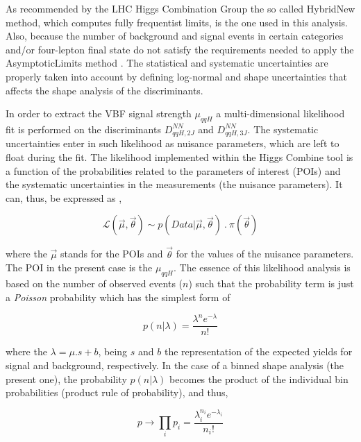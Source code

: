 As recommended by the LHC Higgs Combination Group \cite{bib:HiggsCombineToolWebPage} the so called HybridNew method, which computes fully frequentist limits, is the one used in this analysis. Also, because the number of background and signal events in certain categories and/or four-lepton final state do not satisfy the requirements needed to apply the AsymptoticLimits method \cite{bib:HiggsCombineToolFNALWorkshop2018}. The statistical and systematic uncertainties are properly taken into account by defining log-normal and shape uncertainties that affects the shape analysis of the discriminants.

In order to extract the VBF signal strength $\mu_{qqH}$ a multi-dimensional likelihood fit is performed on the discriminants $D_{qqH,2J}^{NN}$ and $D_{qqH,3J}^{NN}$. The systematic uncertainties enter in such likelihood as nuisance parameters, which are left to float during the fit. The likelihood implemented within the Higgs Combine tool is a function of the probabilities related to the parameters of interest (POIs) and the systematic uncertainties in the measurements (the nuisance parameters). It can, thus, be expressed as \cite{bib:HiggsCombineToolFNALWorkshop2018},

\begin{equation}
\mathcal{L}(\vec{\mu},\vec{\theta}) \sim p(Data | \vec{\mu},\vec{\theta})~.~ \pi(\vec{\theta})
\end{equation}

where the $\vec{\mu}$ stands for the POIs and $\vec{\theta}$ for the values of the nuisance parameters. The POI in the present case is the $\mu_{qqH}$. The essence of this likelihood analysis is based on the number of observed events ($n$) such that the probability term is just a \textit{Poisson} probability which has the simplest form of

\begin{equation}
p(n | \lambda) = \frac{\lambda^{n} e^{-\lambda}}{n!}
\end{equation}

where the $\lambda = \mu.s + b$, being $s$ and $b$ the representation of the expected yields for signal and background, respectively. In the case of a binned shape analysis (the present one), the probability $p(n | \lambda)$ becomes the product of the individual bin probabilities (product rule of probability), and thus,

\begin{equation}
p \rightarrow \prod_{i} p_{i} = \frac{\lambda_{i}^{n_i} e^{-\lambda_{i}}}{n_i!}
\end{equation}

